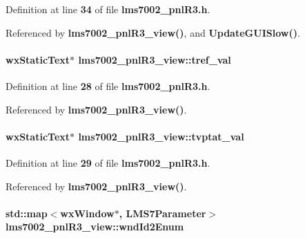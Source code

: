 Definition at line {\bf 34} of file {\bf lms7002\+\_\+pnl\+R3.\+h}.



Referenced by {\bf lms7002\+\_\+pnl\+R3\+\_\+view()}, and {\bf Update\+G\+U\+I\+Slow()}.

\paragraph[{tref\+\_\+val}]{\setlength{\rightskip}{0pt plus 5cm}wx\+Static\+Text$\ast$ lms7002\+\_\+pnl\+R3\+\_\+view\+::tref\+\_\+val\hspace{0.3cm}{\ttfamily [protected]}}\label{classlms7002__pnlR3__view_a5d135435ba67e55a1e26683244852765}


Definition at line {\bf 28} of file {\bf lms7002\+\_\+pnl\+R3.\+h}.



Referenced by {\bf lms7002\+\_\+pnl\+R3\+\_\+view()}.

\paragraph[{tvptat\+\_\+val}]{\setlength{\rightskip}{0pt plus 5cm}wx\+Static\+Text$\ast$ lms7002\+\_\+pnl\+R3\+\_\+view\+::tvptat\+\_\+val\hspace{0.3cm}{\ttfamily [protected]}}\label{classlms7002__pnlR3__view_a0a80cfb09299295b055bf8feeb6e8b73}


Definition at line {\bf 29} of file {\bf lms7002\+\_\+pnl\+R3.\+h}.



Referenced by {\bf lms7002\+\_\+pnl\+R3\+\_\+view()}.

\paragraph[{wnd\+Id2\+Enum}]{\setlength{\rightskip}{0pt plus 5cm}std\+::map$<$wx\+Window$\ast$, {\bf L\+M\+S7\+Parameter}$>$ lms7002\+\_\+pnl\+R3\+\_\+view\+::wnd\+Id2\+Enum\hspace{0.3cm}{\ttfamily [protected]}}\label{classlms7002__pnlR3__view_ad78f5289f926459de2cdc1ce0e681813}


